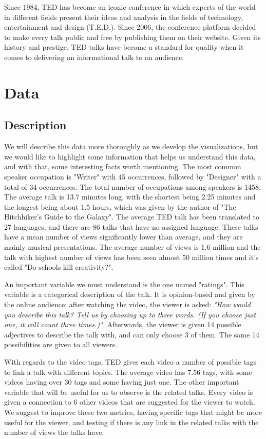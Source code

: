 \documentclass[11pt]{article}
\begin{document}
Since 1984, TED has become an iconic conference in which experts of the
world in different fields present their ideas and analysis in the fields
of technology, entertainment and design (T.E.D.). Since 2006, the
conference platform decided to make every talk public and free by
publishing them on their website. Given its history and prestige, TED
talks have become a standard for quality when it comes to delivering an
informational talk to an audience.

\section{Data}\label{data}

\subsection{Description}\label{description}

We will describe this data more thoroughly as we develop the
visualizations, but we would like to highlight some information that
helps us understand this data, and with that, some interesting facts
worth mentioning. The most common speaker occupation is "Writer" with 45
occurrences, followed by "Designer" with a total of 34 occurrences. The
total number of occupations among speakers is 1458. The average talk is
13.7 minutes long, with the shortest being 2.25 minutes and the longest
being about 1.5 hours, which was given by the author of "The
Hitchhiker's Guide to the Galaxy". The average TED talk has been
translated to 27 languages, and there are 86 talks that have no assigned
language. These talks have a mean number of views significantly lower
than average, and they are mainly musical presentations. The average
number of views is 1.6 million and the talk with highest number of views
has been seen almost 50 million times and it's called "Do schools kill
creativity?".

An important variable we must understand is the one named "ratings".
This variable is a categorical description of the talk. It is
opinion-based and given by the online audience: after watching the
video, the viewer is asked: \emph{"How would you describe this talk?
Tell us by choosing up to three words. (If you choose just one, it will
count three times.)".} Afterwards, the viewer is given 14 possible
adjectives to describe the talk with, and can only choose 3 of them. The
same 14 possibilities are given to all viewers.

With regards to the video tags, TED gives each video a number of
possible tags to link a talk with different topics. The average video
has 7.56 tags, with some videos having over 30 tags and some having just
one. The other important variable that will be useful for us to observe
is the related talks. Every video is given a connection to 6 other
videos that are suggested for the viewer to watch. We suggest to improve
these two metrics, having specific tags that might be more useful for
the viewer, and testing if there is any link in the related talks with
the number of views the talks have.
\end{document}
